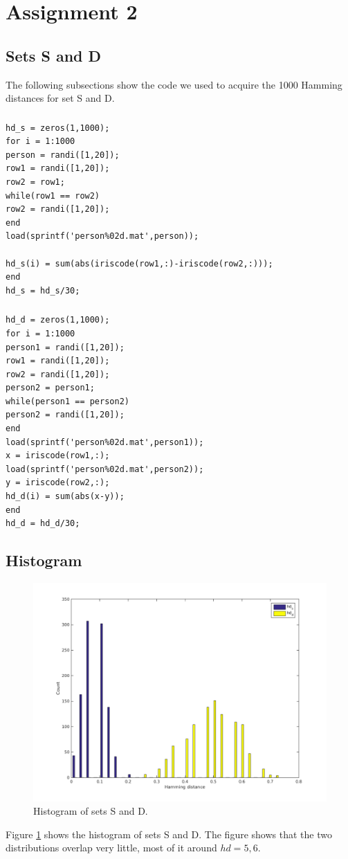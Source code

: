 \documentclass{article}
\begin{document}
\section{Assignment 2}
\setcounter{subsection}{2}
\subsection{Sets S and D}
The following subsections show the code we used to acquire the 1000 Hamming distances for set S and D.
\subsubsection{}
\begin{lstlisting}[title = Code for set S]
hd_s = zeros(1,1000);
for i = 1:1000
person = randi([1,20]);
row1 = randi([1,20]);
row2 = row1;
while(row1 == row2)
row2 = randi([1,20]);
end
load(sprintf('person%02d.mat',person));

hd_s(i) = sum(abs(iriscode(row1,:)-iriscode(row2,:)));
end
hd_s = hd_s/30;
\end{lstlisting}
\subsubsection{}
\begin{lstlisting}[title = Code for set D]
hd_d = zeros(1,1000);
for i = 1:1000
person1 = randi([1,20]);
row1 = randi([1,20]);
row2 = randi([1,20]);
person2 = person1;
while(person1 == person2)
person2 = randi([1,20]);
end
load(sprintf('person%02d.mat',person1));
x = iriscode(row1,:);
load(sprintf('person%02d.mat',person2));
y = iriscode(row2,:);
hd_d(i) = sum(abs(x-y));
end
hd_d = hd_d/30;
\end{lstlisting}

\subsection{Histogram}
\begin{figure}[H]
	\centering
	\includegraphics[width=\linewidth]{plot2_4.png}
	\caption{Histogram of sets S and D.}
	\label{fig2.4}
\end{figure}
Figure \ref{fig2.4} shows the histogram of sets S and D. The figure shows that the two distributions overlap very little, most of it around $hd = 5,6$.
\end{document}
